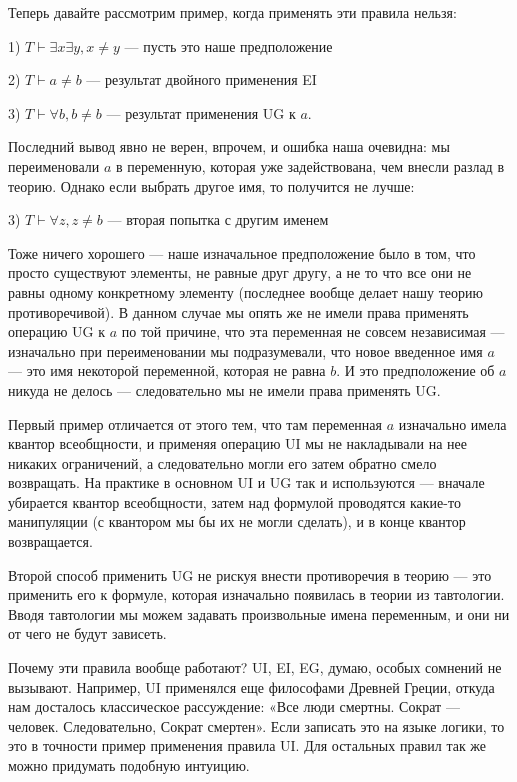 Теперь давайте рассмотрим пример, когда применять эти правила нельзя:

1) $T\vdash \exists x\exists y, x \not= y$ — пусть это наше предположение

2) $T\vdash a \not= b$ — результат двойного применения EI

3) $T\vdash \forall b, b \not= b$ — результат применения UG к $a$.

Последний вывод явно не верен, впрочем, и ошибка наша очевидна: мы переименовали $a$ в переменную, которая уже задействована, чем внесли разлад в теорию. Однако если выбрать другое имя, то получится не лучше:

3) $T\vdash \forall z, z \not= b$ — вторая попытка с другим именем

Тоже ничего хорошего — наше изначальное предположение было в том, что просто существуют элементы, не равные друг другу, а не то что все они не равны одному конкретному элементу (последнее вообще делает нашу теорию противоречивой). В данном случае мы опять же не имели права применять операцию UG к $a$ по той причине, что эта переменная не совсем независимая — изначально при переименовании мы подразумевали, что новое введенное имя $a$ — это имя некоторой переменной, которая не равна $b$. И это предположение об $a$ никуда не делось — следовательно мы не имели права применять UG.

Первый пример отличается от этого тем, что там переменная $a$ изначально имела квантор всеобщности, и применяя операцию UI мы не накладывали на нее никаких ограничений, а следовательно могли его затем обратно смело возвращать. На практике в основном UI и UG так и используются — вначале убирается квантор всеобщности, затем над формулой проводятся какие-то манипуляции (с квантором мы бы их не могли сделать), и в конце квантор возвращается.

Второй способ применить UG не рискуя внести противоречия в теорию — это применить его к формуле, которая изначально появилась в теории из тавтологии. Вводя тавтологии мы можем задавать произвольные имена переменным, и они ни от чего не будут зависеть.

Почему эти правила вообще работают? UI, EI, EG, думаю, особых сомнений не вызывают. Например, UI применялся еще философами Древней Греции, откуда нам досталось классическое рассуждение: «Все люди смертны. Сократ — человек. Следовательно, Сократ смертен». Если записать это на языке логики, то это в точности пример применения правила UI. Для остальных правил так же можно придумать подобную интуицию.

